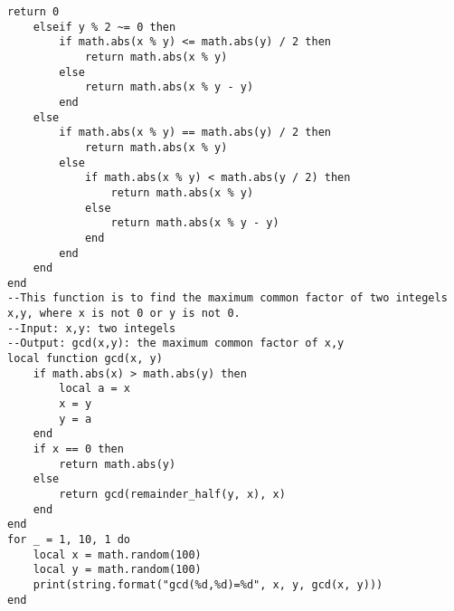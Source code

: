 \documentclass{ctexart}
\begin{document}
\begin{solution}
\begin{enumerate}
\begin{lstlisting}[style=lua]
		return 0
	elseif y % 2 ~= 0 then
		if math.abs(x % y) <= math.abs(y) / 2 then
			return math.abs(x % y)
		else
			return math.abs(x % y - y)
		end
	else
		if math.abs(x % y) == math.abs(y) / 2 then
			return math.abs(x % y)
		else
			if math.abs(x % y) < math.abs(y / 2) then
				return math.abs(x % y)
			else
				return math.abs(x % y - y)
			end
		end
	end
end
--This function is to find the maximum common factor of two integels x,y, where x is not 0 or y is not 0.
--Input: x,y: two integels
--Output: gcd(x,y): the maximum common factor of x,y
local function gcd(x, y)
	if math.abs(x) > math.abs(y) then
		local a = x
		x = y
		y = a
	end
	if x == 0 then
		return math.abs(y)
	else
		return gcd(remainder_half(y, x), x)
	end
end
for _ = 1, 10, 1 do
	local x = math.random(100)
	local y = math.random(100)
	print(string.format("gcd(%d,%d)=%d", x, y, gcd(x, y)))
end
        
      \end{lstlisting}

	\end{enumerate}

\end{solution}
\end{document}
